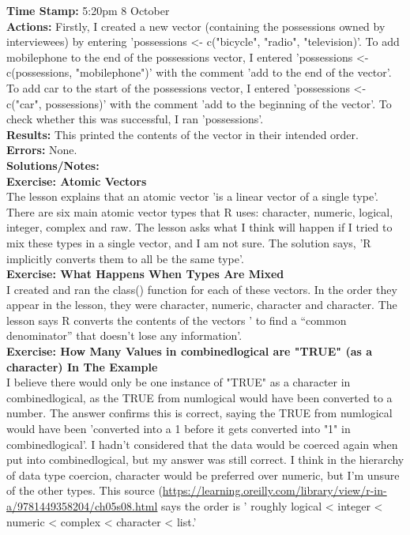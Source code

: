 \documentclass{article}
\begin{document}
\begin{FlushLeft}
\textbf{Time Stamp:} 5:20pm 8 October\\
\textbf{Actions:} Firstly, I created a new vector (containing the possessions owned by interviewees) by entering 'possessions \textless - c("bicycle", "radio", "television)'. To add mobile\textunderscore phone to the end of the possessions vector, I entered 'possessions \textless - c(possessions, "mobile\textunderscore phone")' with the comment 'add to the end of the vector'. To add car to the start of the possessions vector, I entered 'possessions \textless - c("car", possessions)' with the comment 'add to the beginning of the vector'. To check whether this was successful, I ran 'possessions'.\\
\textbf{Results:} This printed the contents of the vector in their intended order.\\
\textbf{Errors:} None.\\
\textbf{Solutions/Notes:}\\
\vspace{5mm}
\textbf{Exercise: Atomic Vectors}\\ 
The lesson explains that an atomic vector 'is a linear vector of a single type'. There are six main atomic vector types that R uses: character, numeric, logical, integer, complex and raw. The lesson asks what I think will happen if I tried to mix these types in a single vector, and I am not sure. The solution says, 'R implicitly converts them to all be the same type'.\\
\vspace{5mm}
\textbf{Exercise: What Happens When Types Are Mixed}\\ 
I created and ran the class() function for each of these vectors. In the order they appear in the lesson, they were character, numeric, character and character. The lesson says R converts the contents of the vectors ' to find a “common denominator” that doesn’t lose any information'.\\
\vspace{5mm}
\textbf{Exercise: How Many Values in combined\textunderscore logical are "TRUE" (as a character) In The Example}\\ 
I believe there would only be one instance of "TRUE" as a character in combined\textunderscore logical, as the TRUE from num\textunderscore logical would have been converted to a number. The answer confirms this is correct, saying the TRUE from num\textunderscore logical would have been 'converted into a 1 before it gets converted into "1" in combined\textunderscore logical'. I hadn't considered that the data would be coerced again when put into combined\textunderscore logical, but my answer was still correct. I think in the hierarchy of data type coercion, character would be preferred over numeric, but I'm unsure of the other types. This source (\url{https://learning.oreilly.com/library/view/r-in-a/9781449358204/ch05s08.html} says the order is ' roughly logical \textless{} integer \textless{} numeric \textless{} complex \textless{} character \textless{} list.'\\

\end{FlushLeft}
\end{document}
